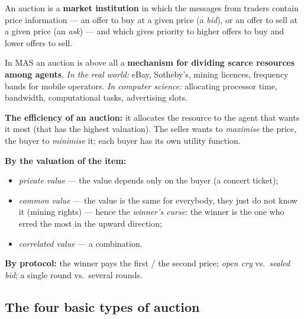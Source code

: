 \documentclass[11pt,a4paper]{article}
\theoremstyle{definition}
\begin{document}
\begin{defbox}[Auction]
An auction is a \textbf{market institution} in which the messages from traders contain price
information --- an offer to buy at a given price (a \emph{bid}), or an offer to sell at a given price
(an \emph{ask}) --- and which gives priority to higher offers to buy and lower offers to sell.

In MAS an auction is above all a \textbf{mechanism for dividing scarce resources among agents}.
\emph{In the real world:} eBay, Sotheby's, mining licences, frequency bands for mobile operators.
\emph{In computer science:} allocating processor time, bandwidth, computational tasks,
advertising slots.

\textbf{The efficiency of an auction:} it allocates the resource to the agent that wants it most (that
has the highest valuation). The seller wants to \emph{maximise} the price, the buyer to
\emph{minimise} it; each buyer has its own utility function.
\end{defbox}

\begin{defbox}
\textbf{By the valuation of the item:}
\begin{itemize}
\item \emph{private value} --- the value depends only on the buyer
  (a concert ticket);
\item \emph{common value} --- the value is the same for everybody, they just do not know it
  (mining rights) --- hence the \emph{winner's curse}:
  the winner is the one who erred the most in the upward direction;
\item \emph{correlated value} --- a combination.
\end{itemize}
\textbf{By protocol:} the winner pays the first / the second price; \emph{open cry}
vs.\ \emph{sealed bid}; a single round vs.\ several rounds.
\end{defbox}
\subsection{The four basic types of auction}
\end{document}
